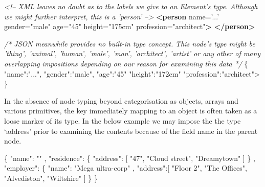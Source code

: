 \documentclass[]{article}
\newenvironment{Shaded}{}{}
\newcommand{\KeywordTok}[1]{\textcolor[rgb]{0.00,0.44,0.13}{\textbf{{#1}}}}
\newcommand{\StringTok}[1]{\textcolor[rgb]{0.25,0.44,0.63}{{#1}}}
\newcommand{\CommentTok}[1]{\textcolor[rgb]{0.38,0.63,0.69}{\textit{{#1}}}}
\newcommand{\OtherTok}[1]{\textcolor[rgb]{0.00,0.44,0.13}{{#1}}}
\newcommand{\NormalTok}[1]{{#1}}
\begin{document}
\begin{Shaded}
\begin{Highlighting}[]
\CommentTok{<!--  XML leaves no doubt as to the labels we give to an Element's type.}
\CommentTok{      Although we might further interpret, this is a 'person' -->}
\KeywordTok{<person}\OtherTok{  name=}\StringTok{'...'}\OtherTok{ gender=}\StringTok{"male"}
\OtherTok{         age=}\StringTok{"45"}\OtherTok{ height=}\StringTok{"175cm"}\OtherTok{ profession=}\StringTok{"architect"}\KeywordTok{>}
\KeywordTok{</person>}
\end{Highlighting}
\end{Shaded}

\begin{Shaded}
\begin{Highlighting}[]
\CommentTok{/*    JSON meanwhile provides no built-in type concept. }
\CommentTok{      This node's type might be 'thing', 'animal', 'human', 'male', 'man', }
\CommentTok{      'architect', 'artist' or any other of many overlapping impositions }
\CommentTok{      depending on our reason for examining this data */}
\NormalTok{\{  }\StringTok{"name"}\NormalTok{:}\StringTok{"..."}\NormalTok{, }\StringTok{"gender"}\NormalTok{:}\StringTok{"male"}\NormalTok{, }\StringTok{"age"}\NormalTok{:}\StringTok{"45"} 
   \StringTok{"height"}\NormalTok{:}\StringTok{"172cm"} \StringTok{"profession"}\NormalTok{:}\StringTok{"architect"}\NormalTok{>}
\NormalTok{\}         }
\end{Highlighting}
\end{Shaded}

In the absence of node typing beyond categorisation as objects, arrays
and various primitives, the key immediately mapping to an object is
often taken as a loose marker of its type. In the below example we may
impose the the type `address' prior to examining the contents because of
the field name in the parent node.

\begin{Shaded}
\begin{Highlighting}[]
\NormalTok{\{}
   \StringTok{"name"}\NormalTok{: }\StringTok{""}
\NormalTok{,  }\StringTok{"residence"}\NormalTok{: \{}
      \StringTok{"address"}\NormalTok{: [}
         \StringTok{"47"}\NormalTok{, }\StringTok{"Cloud street"}\NormalTok{, }\StringTok{"Dreamytown"}
      \NormalTok{]}
   \NormalTok{\}}
\NormalTok{,  }\StringTok{"employer"}\NormalTok{: \{}
      \StringTok{"name"}\NormalTok{: }\StringTok{"Mega ultra-corp"}
   \NormalTok{,  }\StringTok{"address"}\NormalTok{:[}
         \StringTok{"Floor 2"}\NormalTok{, }\StringTok{"The Offices"}\NormalTok{, }\StringTok{"Alvediston"}\NormalTok{, }\StringTok{"Wiltshire"}      
      \NormalTok{]}
   \NormalTok{\}   }
\NormalTok{\}}
\end{Highlighting}
\end{Shaded}
\end{document}

